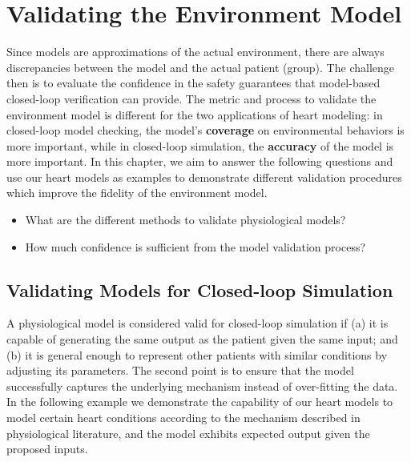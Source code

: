 \section{Validating the Environment Model}
Since models are approximations of the actual environment, there are always discrepancies between the model and the actual patient (group). The challenge then is to evaluate the confidence in the safety guarantees that model-based closed-loop verification can provide. The metric and process to validate the environment model is different for the two applications of heart modeling: in closed-loop model checking, the model's \textbf{coverage} on environmental behaviors is more important, while in closed-loop simulation, the \textbf{accuracy} of the model is more important. In this chapter, we aim to answer the following questions and use our heart models as examples to demonstrate different validation procedures which improve the fidelity of the environment model. 
\begin{itemize}
	\vspace{-5pt}
	\item What are the different methods to validate physiological models?
	\vspace{-5pt}
	\item How much confidence is sufficient from the model validation process?
\end{itemize}

\subsection{Validating Models for Closed-loop Simulation}
A physiological model is considered valid for closed-loop simulation if (a) it is capable of generating the same output as the patient given the same input; and (b) it is general enough to represent other patients with similar conditions by adjusting its parameters. The second point is to ensure that the model successfully captures the underlying mechanism instead of over-fitting the data. In the following example we demonstrate the capability of our heart models to model certain heart conditions according to the mechanism described in physiological literature, and the model exhibits expected output given the proposed inputs.

